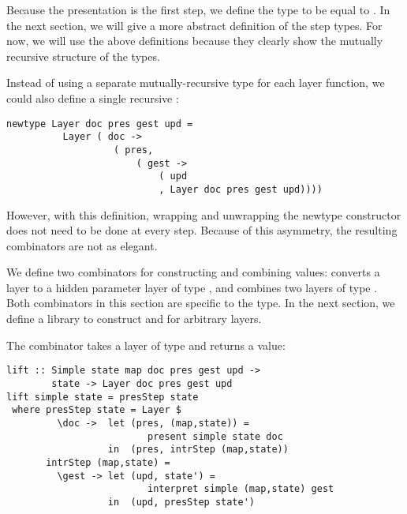 \documentclass[preprint,natbib]{sigplanconf}
\begin{document}
Because the presentation is the first step, we define the  type to be equal to . In the next section, we will give a more abstract definition of the step types. For now, we will use the above definitions because they clearly show the mutually recursive structure of the types. %

Instead of using a separate mutually-recursive type for each layer function, we could also define a single recursive :
\ec
\begin{small}
\begin{verbatim}
newtype Layer doc pres gest upd = 
          Layer ( doc -> 
                   ( pres, 
                       ( gest -> 
                           ( upd 
                           , Layer doc pres gest upd))))
\end{verbatim}
\end{small}

\bc

However, with this definition, wrapping and unwrapping the newtype constructor does not need to be done at every step. Because of this asymmetry, the resulting combinators are not as elegant.
\ec

We define two combinators for constructing and combining  values:  converts  a  layer to a hidden parameter layer of type , and  combines two layers of type . Both combinators in this section are specific to the  type. In the next section, we define a library to construct  and  for arbitrary layers.



The combinator  takes a layer of type  and returns a  value:

\begin{small}
\begin{verbatim}
lift :: Simple state map doc pres gest upd ->
        state -> Layer doc pres gest upd
lift simple state = presStep state 
 where presStep state = Layer $
         \doc ->  let (pres, (map,state)) = 
                         present simple state doc                                         
                  in  (pres, intrStep (map,state))
       intrStep (map,state) =
         \gest -> let (upd, state') = 
                         interpret simple (map,state) gest                     
                  in  (upd, presStep state')
\end{verbatim}%
\end{small}
\end{document}
